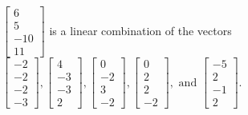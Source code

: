\begin{exercise}
\begin{exerciseStatement}
  \end{exerciseStatement}
  \begin{exerciseAnswer}
   \(\left[\begin{array}{c}
6 \\
5 \\
-10 \\
11
\end{array}\right]\) 
  	 is  
	a linear combination of the vectors \(\left[\begin{array}{c}
-2 \\
-2 \\
-2 \\
-3
\end{array}\right] , \left[\begin{array}{c}
4 \\
-3 \\
-3 \\
2
\end{array}\right] , \left[\begin{array}{c}
0 \\
-2 \\
3 \\
-2
\end{array}\right] , \left[\begin{array}{c}
0 \\
2 \\
2 \\
-2
\end{array}\right] , \text{ and } \left[\begin{array}{c}
-5 \\
2 \\
-1 \\
2
\end{array}\right]\).

	
  


  \end{exerciseAnswer}
\end{exercise}